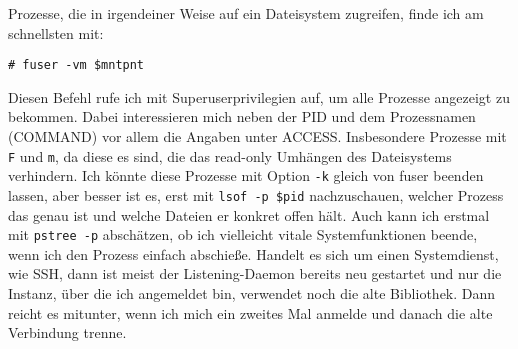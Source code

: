 \begin{normaltext}
  Prozesse, die in irgendeiner Weise auf ein Dateisystem zugreifen, finde ich
  am schnellsten mit:
\begin{verbatim}
# fuser -vm $mntpnt
\end{verbatim}
  Diesen Befehl rufe ich mit Superuserprivilegien auf, um alle Prozesse
  angezeigt zu bekommen.
  Dabei interessieren mich neben der PID und dem Prozessnamen (COMMAND) vor
  allem die Angaben unter ACCESS. Insbesondere Prozesse mit \verb?F? und
  \verb?m?, da diese es sind, die das read-only Umhängen des Dateisystems
  verhindern.
  Ich könnte diese Prozesse mit Option \verb?-k? gleich von fuser beenden
  lassen, aber besser ist es, erst mit \verb?lsof -p $pid? nachzuschauen,
  welcher Prozess das genau ist und welche Dateien er konkret offen hält.
  Auch kann ich erstmal mit \verb?pstree -p? abschätzen, ob ich vielleicht
  vitale Systemfunktionen beende, wenn ich den Prozess einfach abschieße.
  Handelt es sich um einen Systemdienst, wie SSH, dann ist meist der
  Listening-Daemon bereits neu gestartet und nur die Instanz, über die ich
  angemeldet bin, verwendet noch die alte Bibliothek. Dann reicht es mitunter,
  wenn ich mich ein zweites Mal anmelde und danach die alte Verbindung trenne.
\end{normaltext}









